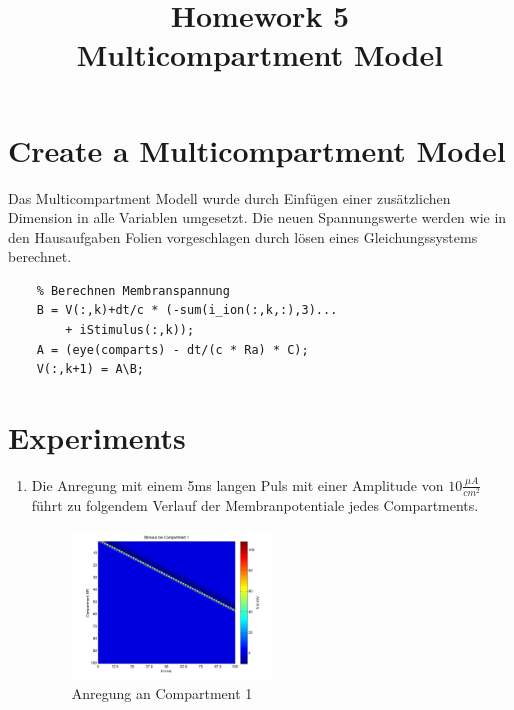 \documentclass[conference]{IEEEtran}
\begin{document}
%
%
\title{Homework 5\\ Multicompartment Model}

\author{
}


\maketitle

\IEEEpeerreviewmaketitle

\section{Create a Multicompartment Model}
Das Multicompartment Modell wurde durch Einfügen einer zusätzlichen Dimension in alle Variablen umgesetzt. Die neuen Spannungswerte werden wie in den Hausaufgaben Folien vorgeschlagen durch lösen eines Gleichungssystems berechnet.

\begin{lstlisting}
    % Berechnen Membranspannung
    B = V(:,k)+dt/c * (-sum(i_ion(:,k,:),3)...
        + iStimulus(:,k));
    A = (eye(comparts) - dt/(c * Ra) * C);
    V(:,k+1) = A\B;
\end{lstlisting}

\section{Experiments}

\begin{enumerate}

\item Die Anregung mit einem 5ms langen Puls mit einer Amplitude von $10\frac{\mu A}{cm^2}$ führt zu folgendem Verlauf der Membranpotentiale jedes Compartments. 

\begin{figure}[h]
	\centering
	\includegraphics[width=0.5\textwidth]{img/compart1.png}
	\caption{Anregung an Compartment 1}
	\label{fig:compart1}
\end{figure}

\end{enumerate}
\end{document}
